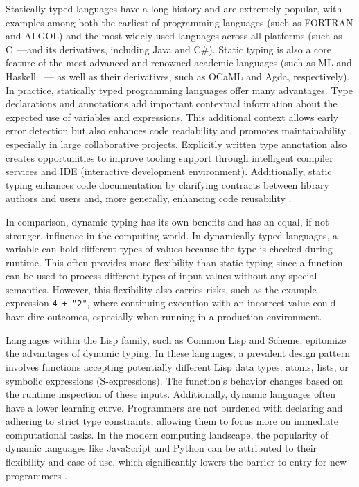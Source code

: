 Statically typed languages have a long history and are extremely popular, with examples among both the earliest of programming languages (such as FORTRAN \cite{Backus1978-xt} and ALGOL) and the most widely used languages across all platforms (such as C~\cite{Ritchie1978-pa}---and its derivatives, including Java and C\#). Static typing is also a core feature of the most advanced and renowned academic languages (such as ML and Haskell~\cite{Hudak2007-kn} --- as well as their derivatives, such as OCaML and Agda, respectively). In practice, statically typed programming languages offer many advantages. Type declarations and annotations add important contextual information about the expected use of variables and expressions. This additional context allows early error detection but also enhances code readability and promotes maintainability \cite{Kleinschmager2012-bg}, especially in large collaborative projects. Explicitly written type annotation also creates opportunities to improve tooling support through intelligent compiler services and IDE (interactive development environment). Additionally, static typing enhances code documentation by clarifying contracts between library authors and users and, more generally, enhancing code reusability \cite{Endrikat2014-uz}.


In comparison, dynamic typing has its own benefits and has an equal, if not stronger, influence in the computing world. In dynamically typed languages, a variable can hold different types of values because the type is checked during runtime. This often provides more flexibility than static typing since a function can be used to process different types of input values without any special semantics. However, this flexibility also carries risks, such as the example expression \texttt{4 + "2"}, where continuing execution with an incorrect value could have dire outcomes, especially when running in a production environment.

Languages within the Lisp family, such as Common Lisp and Scheme, epitomize the advantages of dynamic typing. In these languages, a prevalent design pattern involves functions accepting potentially different Lisp data types: atoms, lists, or symbolic expressions (S-expressions). The function's behavior changes based on the runtime inspection of these inputs. Additionally, dynamic languages often have a lower learning curve. Programmers are not burdened with declaring and adhering to strict type constraints, allowing them to focus more on immediate computational tasks. In the modern computing landscape, the popularity of dynamic languages like JavaScript and Python can be attributed to their flexibility and ease of use, which significantly lowers the barrier to entry for new programmers \cite{Chatley2019-uq}.


